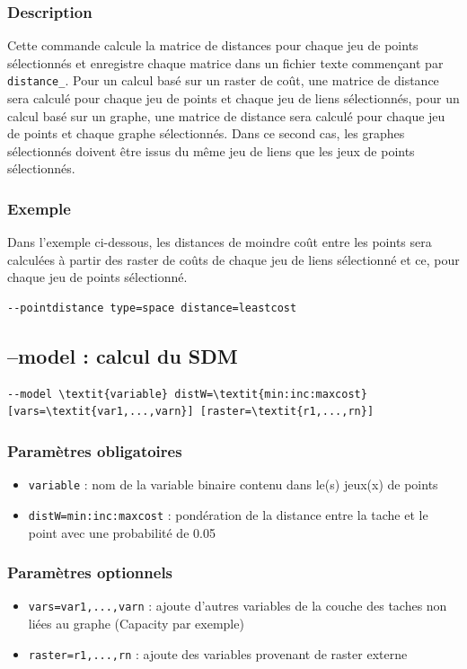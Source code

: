 \documentclass[a4paper,10pt]{report}
\begin{document}
\subsubsection{Description}
Cette commande calcule la matrice de distances pour chaque jeu de points sélectionnés et enregistre chaque matrice dans un fichier texte commençant par \verb|distance_|.
Pour un calcul basé sur un raster de coût, une matrice de distance sera calculé pour chaque jeu de points et chaque jeu de liens sélectionnés, pour un calcul basé sur un graphe, une matrice de distance sera calculé pour chaque jeu de points et chaque graphe sélectionnés. Dans ce second cas, les graphes sélectionnés doivent être issus du même jeu de liens que les jeux de points sélectionnés.

\subsubsection{Exemple}
Dans l'exemple ci-dessous, les distances de moindre coût entre les points sera calculées à partir des raster de coûts de chaque jeu de liens sélectionné et ce, pour chaque jeu de points sélectionné.
\begin{Verbatim}
--pointdistance type=space distance=leastcost
\end{Verbatim}

\subsection{--model : calcul du SDM}
\begin{Verbatim}[commandchars=\\\{\}]
--model \textit{variable} distW=\textit{min:inc:maxcost} [vars=\textit{var1,...,varn}] [raster=\textit{r1,...,rn}]
\end{Verbatim}

\subsubsection{Paramètres obligatoires}
\begin{itemize}
	\item \verb|variable| : nom de la variable binaire contenu dans le(s) jeux(x) de points
	\item \verb|distW=min:inc:maxcost| : pondération de la distance entre la tache et le point avec une probabilité de 0.05	
\end{itemize}

\subsubsection{Paramètres optionnels}
\begin{itemize}
	\item \verb|vars=var1,...,varn| : ajoute d'autres variables de la couche des taches non liées au graphe (Capacity par exemple)
	\item \verb|raster=r1,...,rn| : ajoute des variables provenant de raster externe
\end{itemize}
\end{document}
